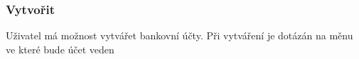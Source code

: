 \documentclass[FM,SP]{tulthesis}
\begin{document}
\subsubsection{Vytvořit}
Uživatel má možnost vytvářet bankovní účty. Při vytváření je dotázán na měnu ve které bude účet veden

\nocite{*}

\printbibliography[title={Použitá literatura}] %


\renewcommand{\indexname}{Přehled příkazů, prostředí a voleb}
\printindex


\end{document}
